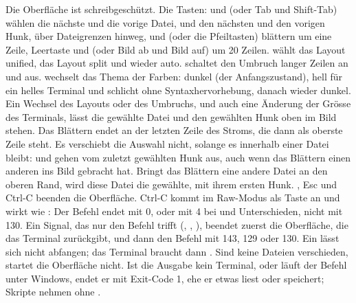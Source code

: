 Die Oberfläche ist schreibgeschützt. Die Tasten:
 und  (oder Tab und Shift-Tab) wählen die nächste und die vorige Datei,
 und  den nächsten und den vorigen Hunk, über Dateigrenzen hinweg,
 und  (oder die Pfeiltasten) blättern um eine Zeile,
Leertaste und  (oder Bild ab und Bild auf) um 20 Zeilen.
 wählt das Layout unified,  das Layout split und  wieder auto.
 schaltet den Umbruch langer Zeilen an und aus.
 wechselt das Thema der Farben: dunkel (der Anfangszustand), hell für ein helles Terminal
und schlicht ohne Syntaxhervorhebung, danach wieder dunkel.
Ein Wechsel des Layouts oder des Umbruchs, und auch eine Änderung der Grösse des Terminals,
lässt die gewählte Datei und den gewählten Hunk oben im Bild stehen.
Das Blättern endet an der letzten Zeile des Stroms, die dann als oberste Zeile steht.
Es verschiebt die Auswahl nicht, solange es innerhalb einer Datei bleibt:  und 
gehen vom zuletzt gewählten Hunk aus, auch wenn das Blättern einen anderen ins Bild gebracht hat.
Bringt das Blättern eine andere Datei an den oberen Rand, wird diese Datei die gewählte, mit
ihrem ersten Hunk.
, Esc und Ctrl-C beenden die Oberfläche. Ctrl-C kommt im Raw-Modus als Taste an und
wirkt wie : Der Befehl endet mit 0, oder mit 4 bei  und
Unterschieden, nicht mit 130.
Ein Signal, das nur den Befehl trifft (, , ),
beendet zuerst die Oberfläche, die das Terminal zurückgibt, und dann den Befehl mit 143, 129
oder 130. Ein  lässt sich nicht abfangen; das Terminal braucht dann .
Sind keine Dateien verschieden, startet die Oberfläche nicht.
Ist die Ausgabe kein Terminal, oder läuft der Befehl unter Windows, endet er mit Exit-Code 1,
ehe er etwas liest oder speichert; Skripte nehmen  ohne .

